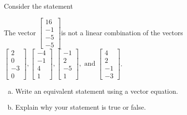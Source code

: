 
\begin{exerciseStatement}


Consider the statement 
\begin{center}\begin{minipage}{0.8\textwidth}
 The vector \( \left[\begin{array}{c}
16 \\
-1 \\
-5 \\
-5
\end{array}\right] \)is not a linear combination of the vectors \( \left[\begin{array}{c}
2 \\
0 \\
-3 \\
0
\end{array}\right] , \left[\begin{array}{c}
-4 \\
-1 \\
4 \\
1
\end{array}\right] , \left[\begin{array}{c}
-1 \\
2 \\
-5 \\
1
\end{array}\right] , \text{ and } \left[\begin{array}{c}
4 \\
2 \\
-1 \\
-3
\end{array}\right] \). 
\end{minipage}\end{center}
    


\begin{enumerate}[(a)]
\item  Write an equivalent statement using a vector equation.
\item  Explain why your statement is true or false.
\end{enumerate}
    
\end{exerciseStatement}
    

